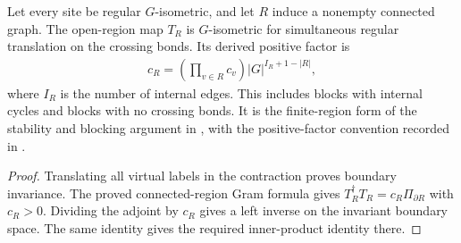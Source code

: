 \begin{lemma}%
    \label{thm:peps_connected_regular_region_isometry}
    \leanok
    Let every site be regular $G$-isometric, and let $R$ induce a nonempty
    connected graph. The open-region map $T_R$ is $G$-isometric for
    simultaneous regular translation on the crossing bonds. Its derived
    positive factor is
    \begin{align}
        c_R=\left(\prod_{v\in R}c_v\right)
        |G|^{I_R+1-|R|},
    \end{align}
    where $I_R$ is the number of internal edges. This includes blocks with
    internal cycles and blocks with no crossing bonds. It is the
    finite-region form of the stability and blocking argument in
    \cite[Lemma~6.2 and \S6.2]{Schuch2010PEPS}, with the positive-factor
    convention recorded in \cite{gap:rmp_peps_quantum_double_g_isometry}.
\end{lemma}
\begin{proof}\leanok
    Translating all virtual labels in the contraction proves boundary
    invariance. The proved connected-region Gram formula gives
    $T_R^\dagger T_R=c_R\Pi_{\partial R}$ with $c_R>0$.
    Dividing the adjoint by $c_R$ gives a left inverse on the invariant
    boundary space. The same identity gives the required inner-product
    identity there.
\end{proof}

